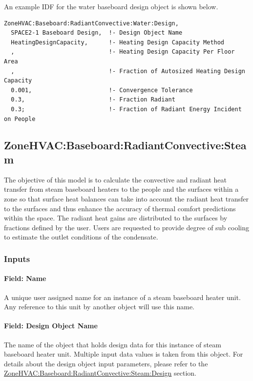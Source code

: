 An example IDF for the water baseboard design object is shown below.

\begin{lstlisting}
ZoneHVAC:Baseboard:RadiantConvective:Water:Design,
  SPACE2-1 Baseboard Design,  !- Design Object Name
  HeatingDesignCapacity,      !- Heating Design Capacity Method
  ,                           !- Heating Design Capacity Per Floor Area
  ,                           !- Fraction of Autosized Heating Design Capacity
  0.001,                      !- Convergence Tolerance
  0.3,                        !- Fraction Radiant
  0.3;                        !- Fraction of Radiant Energy Incident on People
\end{lstlisting}

\subsection{ZoneHVAC:Baseboard:RadiantConvective:Steam}\label{zonehvacbaseboardradiantconvectivesteam}

The objective of this model is to calculate the convective and radiant heat transfer from steam baseboard heaters to the people and the surfaces within a zone so that surface heat balances can take into account the radiant heat transfer to the surfaces and thus enhance the accuracy of thermal comfort predictions within the space. The radiant heat gains are distributed to the surfaces by fractions defined by the user. Users are requested to provide degree of sub cooling to estimate the outlet conditions of the condensate.

\subsubsection{Inputs}\label{inputs-1-035}

\paragraph{Field: Name}\label{field-name-1-034}

A unique user assigned name for an instance of a steam baseboard heater unit. Any reference to this unit by another object will use this name.

\paragraph{Field: Design Object Name}\label{SteamBB_DesignObjectName}

The name of the object that holds design data for this instance of steam baseboard heater unit. Multiple input data values is taken from this object. For details about the design object input parameters, please refer to the \hyperref[zonehvac-baseboard-radiantconvective-steam-design] {ZoneHVAC:Baseboard:RadiantConvective:Steam:Design} section.

